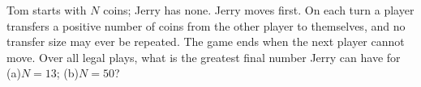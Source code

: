 Tom starts with $N$ coins; Jerry has none. Jerry moves first. On each turn a player transfers a positive number of coins from the other player to themselves, and no transfer size may ever be repeated. The game ends when the next player cannot move. Over all legal plays, what is the greatest final number Jerry can have for (a)$N=13$; (b)$N=50$?
